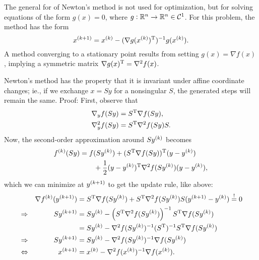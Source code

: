 \documentclass{article}
\begin{document}
\label{s:newton-equations}

The general for of Newton's method is not used for optimization, but for solving equations of the
form \(g(x) = 0\), where \(g: \RR^n \to \RR^n \in \mathcal{C}^1\).  For this problem, the method has
the form
\begin{equation*}
  \kth[k+1]{x} = \kth{x} - (\T{\nabla g(\kth{x})})^{-1} g(\kth{x}).
\end{equation*}
A method converging to a stationary point results from setting \(g(x) = \nabla f(x)\), implying a
symmetric matrix \(\T{\nabla g(x)} = \nabla^2 f(x)\).


\label{s:newton-scale}

Newton's method has the property that it is invariant under affine coordinate changes; ie., if we
exchange \(x = Sy\) for a nonsingular \(S\), the generated steps will remain the same.  Proof:
First, observe that
\begin{align*}
  \nabla_y f(Sy) &= \T{S} \nabla f(Sy), \\
  \nabla_y^2 f(Sy) &= \T{S} \nabla^2 f(Sy) S.
\end{align*}
Now, the second-order approximation around \(S\kth{y}\) becomes
\begin{align*}
  \kth{f}(Sy) &= f(S\kth{y}) + \T{(\T{S} \nabla f(Sy))}(y - \kth{y}) \\
  &\qquad + \frac{1}{2} \T{(y - \kth{y})} \nabla^2 f(S\kth{y}) (y - \kth{y}),
\end{align*}
which we can minimize at \(\kth[k+1]{y}\) to get the update rule, like above:
\begin{align*}
  & &\nabla \kth{f}(\kth[k+1]{y}) &= \T{S} \nabla f(S\kth{y}) + \T{S} \nabla^2
                                 f(S\kth{y})S(\kth[k+1]{y}
                                 - \kth{y}) \overset{!}{=} 0 \\
  &\Rightarrow & S\kth[k+1]{y} &= S\kth{y} - \left( \T{S}\nabla^2 f(S\kth{y}) \right)^{-1} \T{S}
                                  \nabla f(S\kth{y}) \\
  &\phantom{\Rightarrow} & &= S\kth{y} - \nabla^2 f(S\kth{y})^{-1} (\T{S})^{-1}
                                 \T{S} \nabla f(S\kth{y}) \\
  &\Rightarrow & S\kth[k+1]{y} &= S\kth{y} - \nabla^2 f(S\kth{y})^{-1} \nabla f(S\kth{y}) \\
  &\Leftrightarrow & \kth[k+1]{x} &= \kth{x} - \nabla^2 f(\kth{x})^{-1} \nabla f(\kth{x}).
\end{align*}
\end{document}
